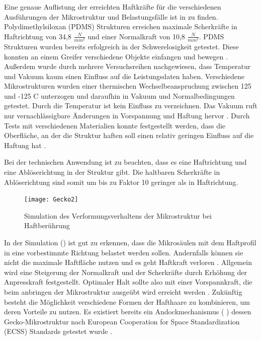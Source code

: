 Eine genaue Auflistung der erreichten Haftkräfte für die verschiedenen Ausführungen der Mikrostruktur und Belastungsfälle ist in \cite[Tabelle1, Seite 23]{Schwerter.} zu finden.
Polydimethylsiloxan (PDMS) Strukturen erreichen maximale Scherkräfte in Haftrichtung von 34,8 $\frac{N}{mm^{2}}$ und einer Normalkraft von 10,8 $\frac{N}{mm^{2}}$.
PDMS Strukturen wurden bereits erfolgreich in der Schwerelosigkeit getestet. Diese konnten an einem Greifer verschiedene Objekte einfangen und bewegen \cite{Schwerter.}. Außerdem wurde durch mehrere Versuchsreihen nachgewiesen, dass Temperatur und Vakuum kaum einen Einfluss auf die Leistungsdaten haben. Verschiedene Mikrostrukturen wurden einer thermischen Wechselbeanspruchung zwischen 125 und  -125 \textdegree{} C unterzogen und daraufhin in Vakuum und Normalbedingungen getestet. Durch die Temperatur ist kein Einfluss zu verzeichnen. Das Vakuum ruft nur vernachlässigbare Änderungen in Vorspannung und Haftung hervor \cite[Seite 7, Figure 11]{Moreels.}. Durch Tests mit verschiedenen Materialien konnte festgestellt werden, dass die Oberfläche, an der die Struktur haften soll einen relativ geringen Einfluss auf die Haftung hat \cite[Seite 9, Figure 16]{Moreels.}. 

Bei der technischen Anwendung ist zu beachten, dass es eine Haftrichtung und eine Ablöserichtung in der Struktur gibt. Die haltbaren Scherkräfte in Ablöserichtung sind somit um bis zu Faktor 10 geringer als in Haftrichtung\cite{Schwerter.}.
\begin{figure}[h]
	\centering
		\texttt{[image: Gecko2]}
	\caption{Simulation des Verformungsverhaltens der Mikrostruktur bei Haftberührung \cite[Abbildung 19, Seite43]{Schwerter.}}
	\label{fig:Gecko2}
\end{figure}	


In der Simulation () ist gut zu erkennen, dass die Mikrosäulen mit dem Haftprofil in eine vorbestimmte Richtung belastet werden sollen. Andernfalls können sie nicht die maximale Haftfläche nutzen und es geht Haftkraft verloren \cite{Schwerter.}. 
Allgemein wird eine Steigerung der Normalkraft und der Scherkräfte durch Erhöhung der Anpresskraft festgestellt. Optimaler Halt sollte also mit einer Vorspannkraft, die beim anbringen der Mikrostruktur ausgeübt wird erreicht werden \cite{Schwerter.}.  Zukünftig besteht die Möglichkeit verschiedene Formen der Hafthaare zu kombinieren, um deren Vorteile zu nutzen. 
Es existiert bereits ein Andockmechanismus ( ) dessen Gecko-Mikrostruktur nach  European Cooperation for Space Standardization (ECSS) Standards getestet wurde \cite[Seite 10]{ChristopherTrentlage.2018}. 


